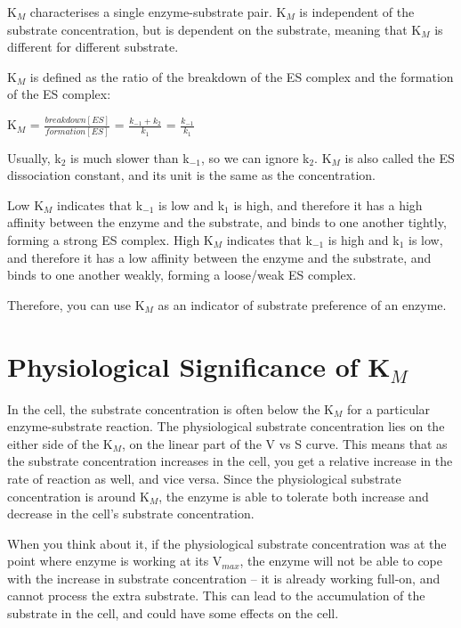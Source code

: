 \begin{center}
\end{center}

K$_M$ characterises a single enzyme-substrate pair.
K$_M$ is independent of the substrate concentration, but is dependent on the substrate, meaning that K$_M$ is different for different substrate.

K$_M$ is defined as the ratio of the breakdown of the ES complex and the formation of the ES complex:

\begin{center}
\large{K$_M$ = $\frac{breakdown[ES]}{formation[ES]}$ = $\frac{k_{-1} + k_2}{k_1}$ = $\frac{k_{-1}}{k_1}$}
\end{center}

Usually, k$_2$ is much slower than k$_{-1}$, so we can ignore k$_2$.
K$_M$ is also called the ES dissociation constant, and its unit is the same as the concentration.

Low K$_M$ indicates that k$_{-1}$ is low and k$_1$ is high, and therefore it has a high affinity between the enzyme and the substrate, and binds to one another tightly, forming a strong ES complex.
High K$_M$ indicates that k$_{-1}$ is high and k$_1$ is low, and therefore it has a low affinity between the enzyme and the substrate, and binds to one another weakly, forming a loose/weak ES complex.

Therefore, you can use K$_M$ as an indicator of substrate preference of an enzyme.

\section{Physiological Significance of K$_M$}

In the cell, the substrate concentration is often below the K$_M$ for a particular enzyme-substrate reaction.
The physiological substrate concentration lies on the either side of the K$_M$, on the linear part of the V vs S curve.
This means that as the substrate concentration increases in the cell, you get a relative increase in the rate of reaction as well, and vice versa.
Since the physiological substrate concentration is around K$_M$, the enzyme is able to tolerate both increase and decrease in the cell's substrate concentration.

When you think about it, if the physiological substrate concentration was at the point where enzyme is working at its V$_{max}$, the enzyme will not be able to cope with the increase in substrate concentration -- it is already working full-on, and cannot process the extra substrate.
This can lead to the accumulation of the substrate in the cell, and could have some effects on the cell.

